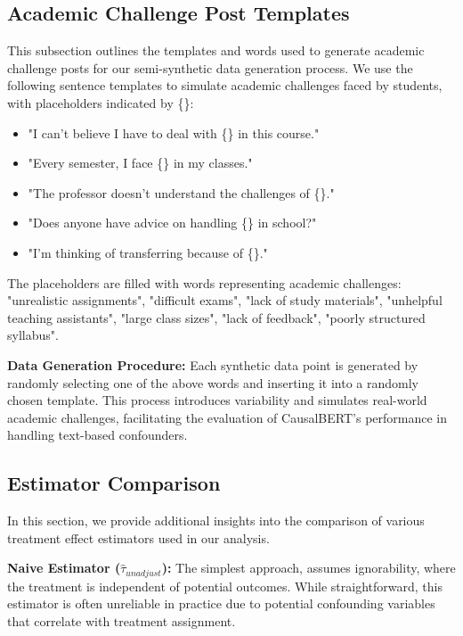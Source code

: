 \documentclass[11pt]{article}
\begin{document}
\subsection{Academic Challenge Post Templates}
\label{subsec:academic-challenge-templates}
This subsection outlines the templates and words used to generate academic challenge posts for our semi-synthetic data generation process. We use the following sentence templates to simulate academic challenges faced by students, with placeholders indicated by \{\}:
\begin{itemize}
    \item "I can't believe I have to deal with \{\} in this course."
    \item "Every semester, I face \{\} in my classes."
    \item "The professor doesn't understand the challenges of \{\}."
    \item "Does anyone have advice on handling \{\} in school?"
    \item "I'm thinking of transferring because of \{\}."
\end{itemize}

The placeholders are filled with words representing academic challenges: "unrealistic assignments", "difficult exams", "lack of study materials", "unhelpful teaching assistants", "large class sizes", "lack of feedback", "poorly structured syllabus".

\textbf{Data Generation Procedure:}
Each synthetic data point is generated by randomly selecting one of the above words and inserting it into a randomly chosen template. This process introduces variability and simulates real-world academic challenges, facilitating the evaluation of CausalBERT's performance in handling text-based confounders.


\subsection{Estimator Comparison}
\label{subsec:estimationtreatmenteffectsappendix}
In this section, we provide additional insights into the comparison of various treatment effect estimators used in our analysis. 

\textbf{Naive Estimator (\(\hat{\tau}_{unadjust}\)):} The simplest approach, assumes ignorability, where the treatment is independent of potential outcomes. While straightforward, this estimator is often unreliable in practice due to potential confounding variables that correlate with treatment assignment.
\end{document}
